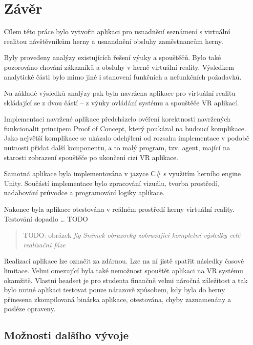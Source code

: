 \section{Závěr}\label{zuxe1vux11br}

Cílem této práce bylo vytvořit aplikaci pro usnadnění seznámení s
virtuální realitou návštěvníkům herny a usnandnění obsluhy zaměstnancům
herny.

Byly provedeny analýzy existujících řešení výuky a spouštěčů. Bylo také
pozorováno chování zákazníků a obsluhy v herně virtuální reality.
Výsledkem analytické části bylo mimo jiné i stanovení funkčních a
nefunkčních požadavků.

Na základě výsledků analýzy pak byla navržena aplikace pro virtuální
realitu skládající se z dvou částí -- z výuky ovládání systému a
spouštěče VR aplikací.

Implementaci navržené aplikace předcházelo ověření korektnosti
navržených funkcionalit principem Proof of Concept, který poukázal na
budoucí komplikace. Jako největší komplikace se ukázalo odchýlení od
rozsahu implementace v podobě nutnosti přidat další komponentu, a to
malý program, tzv. agent, mající na starosti zobrazení spouštěče po
ukončení cizí VR aplikace.

Samotná aplikace byla implementována v jazyce C\# s využitím herního
engine Unity. Součástí implementace bylo zpracování vizuálu, tvorba
prostředí, nadabování průvodce a programování logiky aplikace.

Nakonec byla aplikace otestována v reálném prostředí herny virtuální
reality. Testování dopadlo \ldots{} TODO

\begin{quote}
TODO: obrázek \emph{fig Snímek obrazovky zobrazující kompletní výsledky
celé realizační fáze}
\end{quote}

Realizaci aplikace lze označit za zdárnou. Lze na ní jistě spatřit
následky časové limitace. Velmi omezující byla také nemožnost spouštět
aplikaci na VR systému okamžitě. Vlastní headset je pro studenta
finančně velmi náročná záležitost a tak bylo nutné aplikaci testovat
pouze nárazově způsobem, kdy byla do herny přinesena zkompilovaná
binárka aplikace, otestována, chyby zaznamenány a posléze opraveny.

\subsection{Možnosti dalšího
vývoje}\label{moux17enosti-dalux161uxedho-vuxfdvoje}

